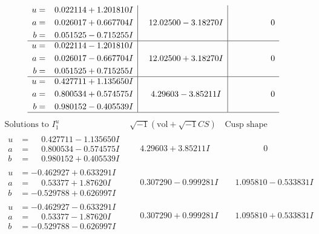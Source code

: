 \documentclass[1p]{elsarticle_modified}
\theoremstyle{definition}
\newcommand{\I}{\sqrt{-1}}
\begin{document}
$$\begin{array}{c|c|c}
\begin{aligned}
u &= \phantom{-}0.022114 + 1.201810 I \\
a &= \phantom{-}0.026017 + 0.667704 I \\
b &= \phantom{-}0.051525 - 0.715255 I\end{aligned}
 & \phantom{-}12.02500 - 3.18270 I & \phantom{-0.000000 } 0 \\ \hline\begin{aligned}
u &= \phantom{-}0.022114 - 1.201810 I \\
a &= \phantom{-}0.026017 - 0.667704 I \\
b &= \phantom{-}0.051525 + 0.715255 I\end{aligned}
 & \phantom{-}12.02500 + 3.18270 I & \phantom{-0.000000 } 0 \\ \hline\begin{aligned}
u &= \phantom{-}0.427711 + 1.135650 I \\
a &= \phantom{-}0.800534 + 0.574575 I \\
b &= \phantom{-}0.980152 - 0.405539 I\end{aligned}
 & \phantom{-}4.29603 - 3.85211 I & \phantom{-0.000000 } 0\\
 \hline 
 \end{array}$$\newpage$$\begin{array}{c|c|c}  
\text{Solutions to }I^u_{1}& \I (\text{vol} + \sqrt{-1}CS) & \text{Cusp shape}\\
 \hline 
\begin{aligned}
u &= \phantom{-}0.427711 - 1.135650 I \\
a &= \phantom{-}0.800534 - 0.574575 I \\
b &= \phantom{-}0.980152 + 0.405539 I\end{aligned}
 & \phantom{-}4.29603 + 3.85211 I & \phantom{-0.000000 } 0 \\ \hline\begin{aligned}
u &= -0.462927 + 0.633291 I \\
a &= \phantom{-}0.53377 + 1.87620 I \\
b &= -0.529788 + 0.626997 I\end{aligned}
 & \phantom{-}0.307290 - 0.999281 I & \phantom{-}1.095810 - 0.533831 I \\ \hline\begin{aligned}
u &= -0.462927 - 0.633291 I \\
a &= \phantom{-}0.53377 - 1.87620 I \\
b &= -0.529788 - 0.626997 I\end{aligned}
 & \phantom{-}0.307290 + 0.999281 I & \phantom{-}1.095810 + 0.533831 I \\ \hline\begin{aligned}

\end{aligned}
\end{array}$$
\end{document}
